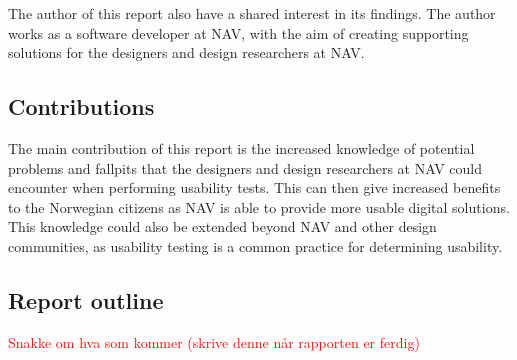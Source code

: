 The author of this report also have a shared interest in its findings. The author works as a software developer at NAV, with the aim of creating supporting solutions for the designers and design researchers at NAV.

\subsection{Contributions}
The main contribution of this report is the increased knowledge of potential problems and fallpits that the designers and design researchers at NAV could encounter when performing usability tests. This can then give increased benefits to the Norwegian citizens as NAV is able to provide more usable digital solutions. This knowledge could also be extended beyond NAV and other design communities, as usability testing is a common practice for determining usability.

\subsection{Report outline}

\textcolor{red}{Snakke om hva som kommer (skrive denne når rapporten er ferdig) }